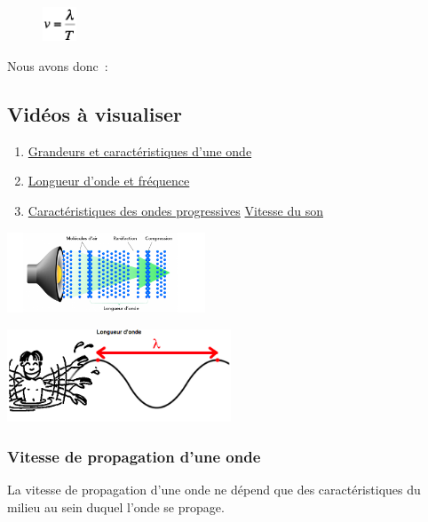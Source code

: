\begin{figure}
\centering
\includegraphics[width=1.011cm,height=1.011cm]{Pictures/100000010000002500000025CFFC3028DD656A44.png}
\caption{}
\end{figure}

Nous avons donc~:

\subsection{Vidéos à visualiser}

\begin{enumerate}
 \item \href{https://youtu.be/4dnzEEHRTEI}{Grandeurs et caractéristiques d'une
onde}
 \item \href{https://youtu.be/2ww9MBD9UC0}{Longueur d'onde et fréquence}
 \item  \href{https://youtu.be/C5woKhTTKCM}{Caractéristiques des ondes progressives}
\href{https://youtu.be/pkv9OIHOmSU}{Vitesse du son}
\end{enumerate}

\includegraphics[width=5.913cm,height=2.417cm]{Pictures/100000010000030600000136256A22B2EA4BE45D.png}

\includegraphics[width=6.668cm,height=2.748cm]{Pictures/100000010000028B0000010CEC2C8A290864C23E.png}

\subsubsection{Vitesse de propagation d'une onde }

La vitesse de propagation d'une onde ne dépend que des caractéristiques du milieu
au sein duquel l'onde se propage. 

